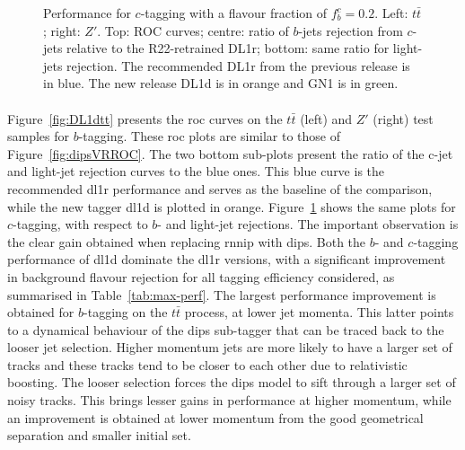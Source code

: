 \begin{figure}[h!]
{  }
  \caption{Performance for $c$-tagging with a flavour fraction of $f^c_b = 0.2$. Left: $t\bar{t}$; right: $Z'$. Top: ROC curves; centre: ratio of $b$-jets rejection from $c$-jets relative to the R22-retrained DL1r; bottom: same ratio for light-jets rejection. The recommended DL1r from the previous release is in blue. The new release DL1d is in orange and GN1 is in green.}
  \label{fig:DL1dz}
\end{figure}

\paragraph{}Figure~\ref{fig:DL1dtt} presents the \gls{roc} curves on the $t\bar{t}$ (left) and $Z'$ (right) test samples for $b$-tagging. These \gls{roc} plots are similar to those of Figure~\ref{fig:dipsVRROC}. The two bottom sub-plots present the ratio of the c-jet and light-jet rejection curves to the blue ones. This blue curve is the recommended \gls{dl1r} performance and serves as the baseline of the comparison, while the new tagger \gls{dl1d} is plotted in orange. Figure~\ref{fig:DL1dz} shows the same plots for $c$-tagging, with respect to $b$- and light-jet rejections. The important observation is the clear gain obtained when replacing \gls{rnnip} with \gls{dips}. Both the $b$- and $c$-tagging performance of \gls{dl1d} dominate the \gls{dl1r} versions, with a significant improvement in background flavour rejection for all tagging efficiency considered, as summarised in Table~\ref{tab:max-perf}. The largest performance improvement is obtained for $b$-tagging on the $t\bar{t}$ process, at lower jet momenta. This latter points to a dynamical behaviour of the \gls{dips} sub-tagger that can be traced back to the looser jet selection. Higher momentum jets are more likely to have a larger set of tracks and these tracks tend to be closer to each other due to relativistic boosting. The looser selection forces the \gls{dips} model to sift through a larger set of noisy tracks. This brings lesser gains in performance at higher momentum, while an improvement is obtained at lower momentum from the good geometrical separation and smaller initial set.  \\


